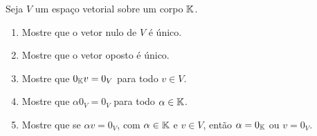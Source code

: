\documentclass[12pt]{exam}
\begin{document}
\begin{exercicio}
  Seja $V$ um espaço vetorial sobre um corpo $\mathbb{K}$.
  \begin{enumerate}[label={\alph*})]
    \item Mostre que o vetor nulo de $V$ é único.
    \item Mostre que o vetor oposto é único.
    \item Mostre que $0_{\mathbb{K}} v = 0_V$ para todo $v \in V$.
    \item Mostre que $\alpha 0_V = 0_V$ para todo $\alpha \in \mathbb{K}$.
    \item Mostre que se $\alpha v = 0_V$, com $\alpha \in \mathbb{K}$ e $v \in V$, então $\alpha = 0_{\mathbb{K}}$ ou $v = 0_V$.
  \end{enumerate}
\end{exercicio}

%
\end{document}
